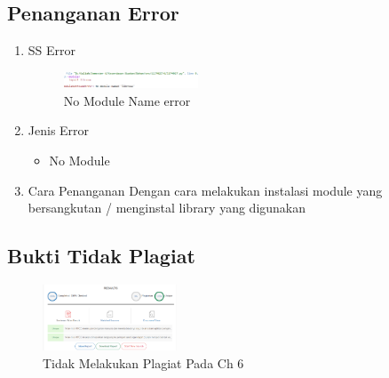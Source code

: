 \subsection{Penanganan Error}
\begin{enumerate}
	\item SS Error
	\begin{figure}[H]
		\includegraphics[width=4cm]{figures/1174086/error/6_no_module.png}
		\centering
		\caption{No Module Name error}
	\end{figure}
	\item Jenis Error
	\begin{itemize}
		\item No Module
	\end{itemize}
	\item Cara Penanganan
	\hfill\break
	Dengan cara melakukan instalasi module yang bersangkutan / menginstal library yang digunakan
\end{enumerate}
\subsection{Bukti Tidak Plagiat}
\begin{figure}[H]
    \includegraphics[width=4cm]{figures/1174086/bukti/6.png}
    \centering
    \caption{Tidak Melakukan Plagiat Pada Ch 6}
\end{figure}
